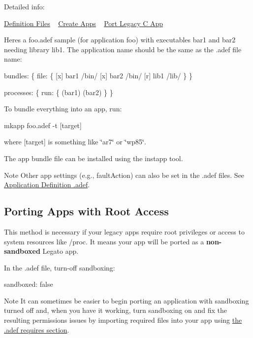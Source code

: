 Detailed info\+:

\hyperlink{defFiles}{Definition Files} ~\newline
 \hyperlink{basicAppsCreate}{Create Apps} ~\newline
 \hyperlink{howToPortLegacyC}{Port Legacy C App}

Here\textquotesingle{}s a {\ttfamily foo.\+adef} sample (for application foo) with executables bar1 and bar2 needing library lib1. The application name should be the same as the .adef file name\+:


\begin{DoxyCode}
bundles:
\{
    file:
    \{
        [x] bar1    /bin/
        [x] bar2    /bin/
        [r] lib1    /lib/
    \}
\}

processes:
\{
    run:
    \{
        (bar1)
        (bar2)
    \}
\}
\end{DoxyCode}


To bundle everything into an app, run\+: 
\begin{DoxyCode}
mkapp foo.adef -t [target] 
\end{DoxyCode}
 where \mbox{[}target\mbox{]} is something like \char`\"{}ar7\char`\"{} or \char`\"{}wp85\char`\"{}.

The app bundle file can be installed using the {\ttfamily instapp} tool.

\begin{DoxyNote}{Note}
Other app settings (e.\+g., {\ttfamily fault\+Action}) can also be set in the .adef files. See \hyperlink{defFilesAdef}{Application Definition .adef}.
\end{DoxyNote}
\hypertarget{how_to_port_legacy_gen_howToPortLegacyGen_portRootAccess}{}\subsection{Porting Apps with Root Access}\label{how_to_port_legacy_gen_howToPortLegacyGen_portRootAccess}
This method is necessary if your legacy apps require root privileges or access to system resources like {\ttfamily /proc}. It means your app will be ported as a {\bfseries non-\/sandboxed} Legato app.

In the .adef file, turn-\/off sandboxing\+:


\begin{DoxyCode}
sandboxed: \textcolor{keyword}{false}
\end{DoxyCode}


\begin{DoxyNote}{Note}
It can sometimes be easier to begin porting an application with sandboxing turned off and, when you have it working, turn sandboxing on and fix the resulting permissions issues by importing required files into your app using \hyperlink{def_files_adef_defFilesAdef_requires}{the .adef requires section}.
\end{DoxyNote}




